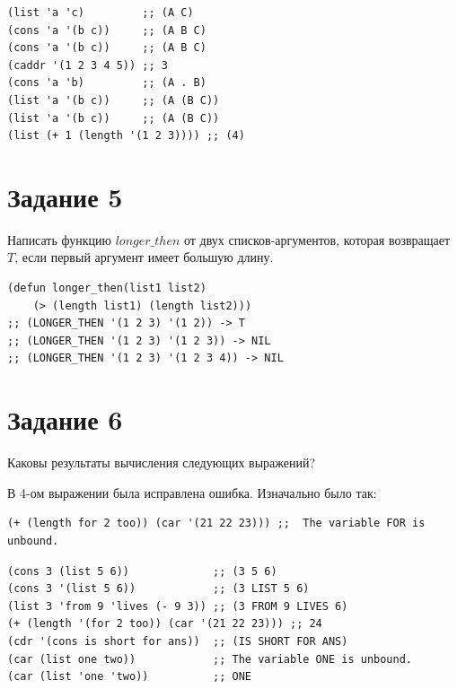 \documentclass[a4paper,14pt, unknownkeysallowed]{extreport}
\begin{document}
\begin{center}
\captionsetup{justification=raggedright,singlelinecheck=off}
\begin{lstlisting}[label=lst:parallel_processing,caption=Варианты следующих выражений с устраненными ошибками]
(list 'a 'c)         ;; (A C)
(cons 'a '(b c))     ;; (A B C)
(cons 'a '(b c))     ;; (A B C)
(caddr '(1 2 3 4 5)) ;; 3
(cons 'a 'b)         ;; (A . B)
(list 'a '(b c))     ;; (A (B C))
(list 'a '(b c))     ;; (A (B C))
(list (+ 1 (length '(1 2 3)))) ;; (4)
\end{lstlisting}
\end{center}

\section{Задание 5}

Написать функцию $longer\_then$ от двух списков-аргументов, которая возвращает $T$, если первый аргумент имеет большую длину.

\begin{center}
\captionsetup{justification=raggedright,singlelinecheck=off}
\begin{lstlisting}[label=lst:parallel_processing,caption=Решение задания 5]
(defun longer_then(list1 list2) 
	(> (length list1) (length list2)))
;; (LONGER_THEN '(1 2 3) '(1 2)) -> T
;; (LONGER_THEN '(1 2 3) '(1 2 3)) -> NIL
;; (LONGER_THEN '(1 2 3) '(1 2 3 4)) -> NIL
\end{lstlisting}
\end{center}

\section{Задание 6}

Каковы результаты вычисления следующих выражений?\newline

В 4-ом выражении была исправлена ошибка. Изначально было так:
\begin{center}
\captionsetup{justification=raggedright,singlelinecheck=off}
\begin{lstlisting}[label=lst:parallel_processing,caption=Исходное 4-ое выражение]
(+ (length for 2 too)) (car '(21 22 23))) ;;  The variable FOR is unbound.
\end{lstlisting}
\end{center}

\begin{center}
\captionsetup{justification=raggedright,singlelinecheck=off}
\begin{lstlisting}[label=lst:parallel_processing,caption=Решение задания 6]
(cons 3 (list 5 6))             ;; (3 5 6)
(cons 3 '(list 5 6))            ;; (3 LIST 5 6)
(list 3 'from 9 'lives (- 9 3)) ;; (3 FROM 9 LIVES 6)
(+ (length '(for 2 too)) (car '(21 22 23))) ;; 24
(cdr '(cons is short for ans))  ;; (IS SHORT FOR ANS)
(car (list one two))            ;; The variable ONE is unbound.
(car (list 'one 'two))          ;; ONE
\end{lstlisting}
\end{center}
\end{document}
